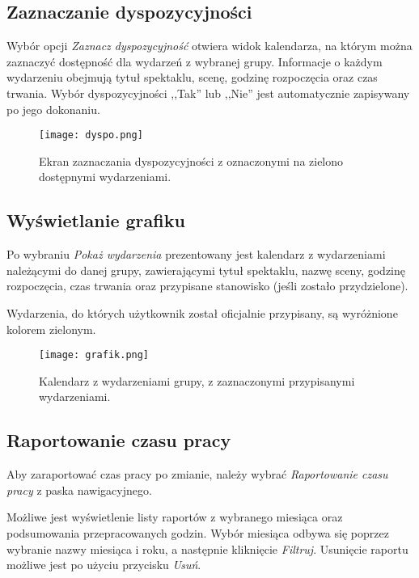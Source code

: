 \documentclass[shortabstract]{iithesis}
\begin{document}
\subsection{Zaznaczanie dyspozycyjności}

Wybór opcji \textit{Zaznacz dyspozycyjność} otwiera widok kalendarza, na którym można zaznaczyć dostępność dla wydarzeń z wybranej grupy. Informacje o każdym wydarzeniu obejmują tytuł spektaklu, scenę, godzinę rozpoczęcia oraz czas trwania. Wybór dyspozycyjności ,,Tak'' lub ,,Nie'' jest automatycznie zapisywany po jego dokonaniu.

\begin{figure}[H]
    \centering
    \texttt{[image: dyspo.png]}
    \caption{Ekran zaznaczania dyspozycyjności z oznaczonymi na zielono dostępnymi wydarzeniami.}
    \label{fig:availability}
\end{figure}

\subsection{Wyświetlanie grafiku}

Po wybraniu \textit{Pokaż wydarzenia} prezentowany jest kalendarz z wydarzeniami należącymi do danej grupy, zawierającymi tytuł spektaklu, nazwę sceny, godzinę rozpoczęcia, czas trwania oraz przypisane stanowisko (jeśli zostało przydzielone).

Wydarzenia, do których użytkownik został oficjalnie przypisany, są wyróżnione kolorem zielonym.

\begin{figure}[H]
    \centering
    \texttt{[image: grafik.png]}
    \caption{Kalendarz z wydarzeniami grupy, z zaznaczonymi przypisanymi wydarzeniami.}
    \label{fig:schedule}
\end{figure}



\subsection{Raportowanie czasu pracy}

Aby zaraportować czas pracy po zmianie, należy wybrać \textit{Raportowanie czasu pracy} z paska nawigacyjnego.

Możliwe jest wyświetlenie listy raportów z wybranego miesiąca oraz podsumowania przepracowanych godzin. Wybór miesiąca odbywa się poprzez wybranie nazwy miesiąca i roku, a następnie kliknięcie \textit{Filtruj}. Usunięcie raportu możliwe jest po użyciu przycisku \textit{Usuń}.
\end{document}
